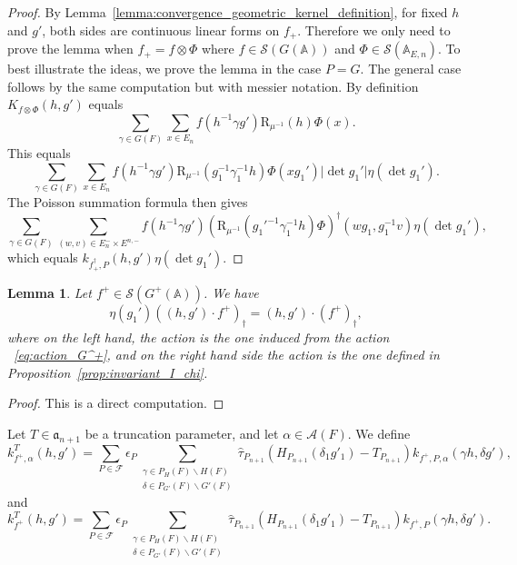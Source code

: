 \documentclass[letterpaper,11pt]{amsart}
\newcommand{\fa}{\mathfrak{a}}
\newcommand{\bA}{\mathbb{A}}
\newcommand{\cA}{\mathcal{A}}
\newcommand{\cF}{\mathcal{F}}
\newcommand{\cS}{\mathcal{S}}
\newcommand{\bs}{\backslash}
\newcommand{\<}{\negthickspace}
\providecommand{\abs}[1]{\lvert#1\rvert}
\theoremstyle{definition}
\theoremstyle{plain}
\newtheorem{lemma}[definition]{Lemma}
\theoremstyle{remark}
\numberwithin{equation}{section}
\begin{document}
\begin{proof}
By Lemma~\ref{lemma:convergence_geometric_kernel_definition}, for fixed $h$
and $g'$, both sides are continuous linear forms on $f_+$. Therefore we only
need to prove the lemma when $f_+ = f \otimes \Phi$ where $f \in
\cS(G(\bA))$ and $\Phi \in \cS(\bA_{E, n})$. To best illustrate the ideas,
we prove the lemma in the case $P = G$. The general case follows by the same
computation but with messier notation. By definition $K_{f \otimes \Phi}(h, g')$
equals
    \[
    \sum_{\gamma \in G(F)} \sum_{x \in E_n} f(h^{-1} \gamma g')
    \mathrm{R}_{\mu^{-1}}(h) \Phi(x).
    \]
This equals
    \[
    \sum_{\gamma \in G(F)} \sum_{x \in E_n} f(h^{-1} \gamma g')
    \mathrm{R}_{\mu^{-1}}(g_1^{-1} \gamma_1^{-1} h)
    \Phi(xg_1') \abs{\det g_1'} \eta(\det g_1').
    \]
The Poisson summation formula then gives
    \[
    \sum_{\gamma \in G(F)} \sum_{(w, v) \in E_n^- \times E^{n, -}}
    f(h^{-1} \gamma g')
    (\mathrm{R}_{\mu^{-1}}(g_1'^{-1} \gamma_1^{-1} h) \Phi)^\dag
    (wg_1, g_1^{-1} v) \eta(\det g_1'),
    \]
which equals $k_{f_+^\dag, P}(h, g') \eta(\det g_1')$.
\end{proof}



\begin{lemma}   \label{lemma:FT_invariance_GL}
Let $f^+ \in \cS(G^+(\bA))$. We have
    \[
    \eta(g_1')
    ((h, g') \cdot f^+)_{\dag} =
    (h, g') \cdot (f^+)_\dag,
    \]
where on the left hand, the action is the one induced from the
action ~\eqref{eq:action_G^+},
and on the right hand side the action is the one defined in
Proposition~\ref{prop:invariant_I_chi}.
\end{lemma}

\begin{proof}
This is a direct computation.
\end{proof}


Let $T \in \fa_{n+1}$ be a truncation parameter, and let $\alpha \in \cA(F)$. We
define
    \[
    k_{f^+, \alpha}^T(h, g') = \sum_{P \in \cF} \epsilon_P
    \sum_{\substack{\gamma \in P_H(F) \bs H(F)\\
    \delta \in P_{G'}(F) \bs G'(F)}}
    \widehat{\tau}_{P_{n+1}}(H_{P_{n+1}}(\delta_1 g'_1) - T_{P_{n+1}})
    k_{f^+, P, \alpha}(\gamma h, \delta g'),
    \]
and
    \[
    k_{f^+}^T(h, g') = \sum_{P \in \cF} \epsilon_P
    \sum_{\substack{\gamma \in P_H(F) \bs H(F)\\
    \delta \in P_{G'}(F) \bs G'(F)}}
    \widehat{\tau}_{P_{n+1}}(H_{P_{n+1}}(\delta_1 g'_1) - T_{P_{n+1}})
    k_{f^+, P}(\gamma h, \delta g').
    \]
\end{document}
